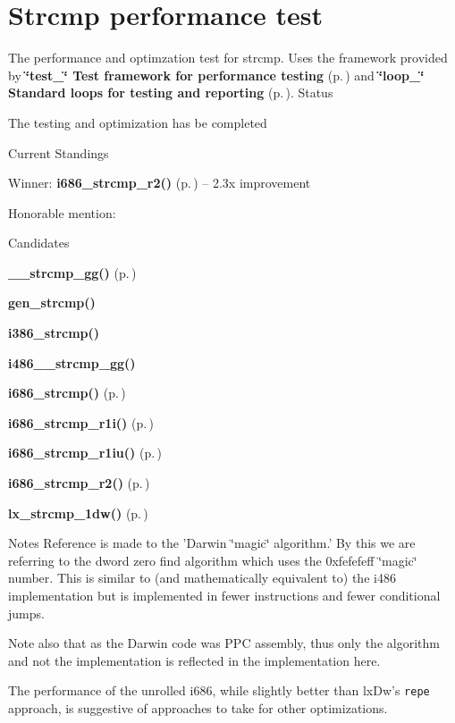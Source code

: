 \section{Strcmp performance test}
\label{group__strcmp__test}
The performance and optimzation test for strcmp. Uses the framework provided by {\bf \char`\"{}test\_\-\char`\"{} Test framework for performance testing} {\rm (p.\,\pageref{group__test})} and {\bf \char`\"{}loop\_\-\char`\"{} Standard loops for testing and reporting} {\rm (p.\,\pageref{group__loop__test})}. 
Status

The testing and optimization has be completed

Current Standings

\begin{CompactItemize}
\item 
Winner: {\bf i686\_\-strcmp\_\-r2()} {\rm (p.\,\pageref{strcmp_2def__test_8h_a12})} -- 2.3x improvement\item 
Honorable mention:\end{CompactItemize}
Candidates

\begin{CompactItemize}
\item 
{\bf \_\-\_\-strcmp\_\-gg()} {\rm (p.\,\pageref{strcmp_2def__test_8h_a5})}\item 
{\bf gen\_\-strcmp()}\item 
{\bf i386\_\-strcmp()}\item 
{\bf i486\_\-\_\-strcmp\_\-gg()}\item 
{\bf i686\_\-strcmp()} {\rm (p.\,\pageref{strcmp_2def__test_8h_a9})}\item 
{\bf i686\_\-strcmp\_\-r1i()} {\rm (p.\,\pageref{strcmp_2def__test_8h_a10})}\item 
{\bf i686\_\-strcmp\_\-r1iu()} {\rm (p.\,\pageref{strcmp_2def__test_8h_a11})}\item 
{\bf i686\_\-strcmp\_\-r2()} {\rm (p.\,\pageref{strcmp_2def__test_8h_a12})}\item 
{\bf lx\_\-strcmp\_\-1dw()} {\rm (p.\,\pageref{strcmp_2def__test_8h_a13})}\end{CompactItemize}
Notes Reference is made to the 'Darwin \char`\"{}magic\char`\"{} algorithm.' By this we are referring to the dword zero find algorithm which uses the 0xfefefeff \char`\"{}magic\char`\"{} number. This is similar to (and mathematically equivalent to) the i486 implementation but is implemented in fewer instructions and fewer conditional jumps.

Note also that as the Darwin code was PPC assembly, thus only the algorithm and not the implementation is reflected in the implementation here.

The performance of the unrolled i686, while slightly better than lx\-Dw's {\tt repe} approach, is suggestive of approaches to take for other optimizations. 